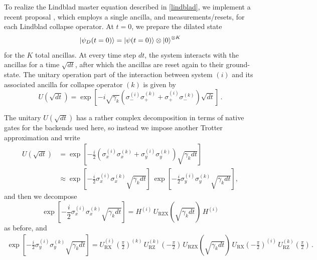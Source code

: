 \documentclass[preprint,3p,sort&compress]{elsarticle}
\begin{document}
To realize the Lindblad master equation described in \eqref{lindblad}, we implement a recent proposal \cite{lindbladsim1, lindbladsim2}, which employs a single ancilla, and measurements/resets, for each Lindblad collapse operator. At $t=0$, we prepare the dilated state 
\begin{equation}
\ket{\psi_D(t=0)}=\ket{\psi(t=0)} \otimes \ket{0}^{\otimes K}    
\end{equation}
 for the $K$ total ancillas. At every time step $dt$, the system interacts with the ancillas for a time $\sqrt{dt}$, after which the ancillas are reset again to their ground-state.  The unitary operation part of the interaction between system $(i)$ and its associated ancilla for collapse operator $(k)$ is given by
\begin{equation}
U(\sqrt{dt}) = \exp[ -i\sqrt{\gamma_k}(\sigma_-^{(i)} \sigma_+^{(k)}+\sigma_+^{(i)} \sigma_-^{(k)})\sqrt{dt} ] \, .\label{ancilla}
\end{equation}

The unitary $U(\sqrt{dt})$ has a rather complex decomposition in terms of native gates for the backends used here, so instead we impose another Trotter approximation and write
\begin{align}
U(\sqrt{dt}) &= \exp[ -\frac{i}{2} (\sigma_x^{(i)} \sigma_x^{(k)}+\sigma_y^{(i)} \sigma_y^{(k)})\sqrt{\gamma_k dt} ] \nonumber\\
&\approx \exp[ -\frac{i}{2} \sigma_x^{(i)} \sigma_x^{(k)} \sqrt{\gamma_k dt}] \, \exp[ -\frac{i}{2} \sigma_y^{(i)} \sigma_y^{(k)}\sqrt{\gamma_k dt} ] ,
\end{align}
and then we decompose
\begin{equation}
\exp[ -\frac{i}{2} \sigma_x^{(i)} \sigma_x^{(k)} \sqrt{\gamma_k  dt} ] = H^{(i)}\, U_{\mathrm{RZX}}(\sqrt{\gamma_k dt})\, H^{(i)}
\end{equation}
as before, and 
\begin{align}
\exp[ -\frac{i}{2} \sigma_y^{(i)} \sigma_y^{(k)}\sqrt{\gamma_k dt} ] = U_{\mathrm{RX}}^{(i)}\left(\frac{\pi}{2}\right)^{(k)}\, U_{\mathrm{RZ}}^{(k)}\left(-\frac{\pi}{2}\right)\, 
U_{\mathrm{RZX}}(\sqrt{\gamma_k dt})\, U_{\mathrm{RX}}\left(-\frac{\pi}{2}\right)^{(i)}\, U_{\mathrm{RZ}}^{(k)}\left(\frac{\pi}{2}\right) \, .
\end{align}
\end{document}

